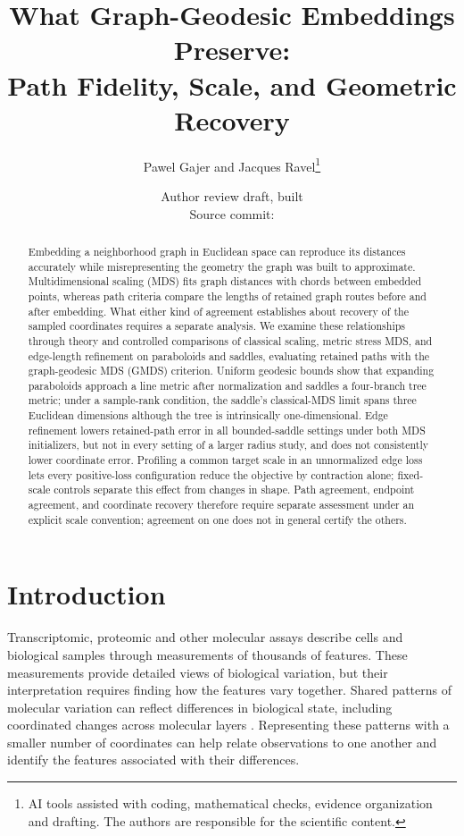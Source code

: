 \documentclass[11pt]{article}
\title{What Graph-Geodesic Embeddings Preserve:\\Path Fidelity, Scale, and Geometric Recovery}
\author{Pawel Gajer and Jacques Ravel\thanks{AI tools assisted with coding,
mathematical checks, evidence organization and drafting. The authors are
responsible for the scientific content.}}
\date{Author review draft, built \manuscriptbuilddatetime\\{\small Source commit: \texttt{\manuscriptcommit}}}
\begin{document}
\maketitle
\begin{abstract}
Embedding a neighborhood graph in Euclidean space can reproduce its distances
accurately while misrepresenting the geometry the graph was built to
approximate. Multidimensional scaling (MDS) fits graph distances with chords
between embedded points, whereas path criteria compare the lengths of retained
graph routes before and after embedding. What either kind of agreement
establishes about recovery of the sampled coordinates requires a separate
analysis. We examine these relationships through theory and controlled
comparisons of classical scaling, metric stress MDS, and edge-length
refinement on paraboloids and saddles, evaluating retained paths with the
graph-geodesic MDS (GMDS) criterion.
Uniform geodesic bounds show that expanding paraboloids approach a line metric
after normalization and saddles a four-branch tree metric; under a sample-rank
condition, the saddle's classical-MDS limit spans three Euclidean dimensions
although the tree is intrinsically one-dimensional. Edge refinement lowers
retained-path error in all \numBoundedGraphs{} bounded-saddle settings under
both MDS initializers, but not in every setting of a larger radius study, and
does not consistently lower coordinate error. Profiling a common target scale in an unnormalized
edge loss lets every positive-loss configuration reduce the objective by
contraction alone; fixed-scale controls separate this effect from changes in
shape. Path agreement, endpoint agreement, and coordinate recovery therefore
require separate assessment under an explicit scale convention; agreement on
one does not in general certify the others.
\end{abstract}

\section{Introduction}
Transcriptomic, proteomic and other molecular assays describe cells and
biological samples through measurements of thousands of features. These
measurements provide detailed views of biological variation, but their
interpretation requires finding how the features vary together. Shared
patterns of molecular variation can reflect differences in biological state,
including coordinated changes across molecular layers
\citep{argelaguet2018mofa}. Representing these patterns with a smaller number
of coordinates can help relate observations to one another and identify the
features associated with their differences.
\end{document}
